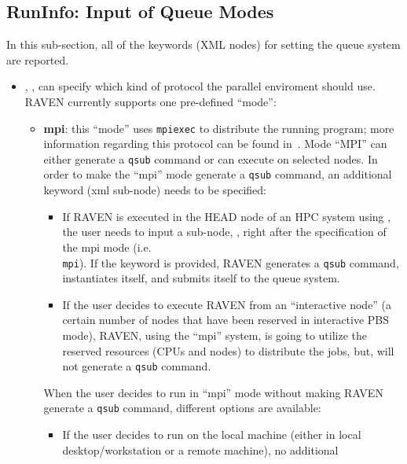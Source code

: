 \subsection{RunInfo: Input of Queue Modes}
\label{subsec:runinfoModes}
In this sub-section, all of the keywords (XML nodes) for setting the queue
system are reported.
\begin{itemize}
\item {}, , can specify which kind
of protocol the parallel enviroment should use.
%
RAVEN currently supports one pre-defined ``mode'':
  \begin{itemize}
    \item \textbf{mpi}: this ``mode'' uses \texttt{mpiexec} to distribute the
      running program; more information regarding this protocol can be found
      in~\cite{MPI}.
      Mode ``MPI''  can either generate a \texttt{qsub} command or can execute
      on selected nodes.
      In order to make the ``mpi'' mode generate a \texttt{qsub} command, an
      additional keyword (xml sub-node) needs to be specified:
         \begin{itemize}
         \item If RAVEN is executed in the HEAD node of an HPC system using
           \cite{PBS}, the user needs to input a sub-node, ,
           right after the specification of the mpi mode (i.e.\\
             \texttt{mpi}).
             If the keyword is provided, RAVEN generates a \texttt{qsub}
             command, instantiates itself, and submits itself to the queue
             system.
           \item If the user decides to execute RAVEN from an ``interactive
             node'' (a certain number of nodes that have been reserved in
             interactive PBS mode), RAVEN, using the ``mpi'' system, is going to
             utilize the reserved resources (CPUs and nodes) to distribute the
             jobs, but, will not generate a \texttt{qsub} command.
         \end{itemize}
     When the user decides to run in ``mpi'' mode without making RAVEN generate
     a \texttt{qsub} command, different options are available:
      \begin{itemize}
           \item If the user decides to run on the local machine (either in
             local desktop/workstation or a remote machine), no additional

\end{itemize}
\end{itemize}
\end{itemize}
